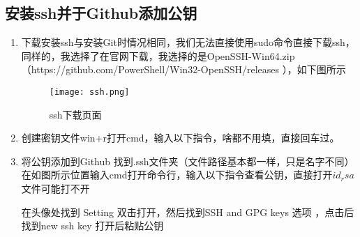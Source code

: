 \documentclass{zjureport}
\begin{document}
	\subsection{安装ssh并于Github添加公钥}
		\begin{enumerate}
			\item{下载安装ssh}与安装Git时情况相同，我们无法直接使用sudo命令直接下载ssh，同样的，我选择了在官网下载，我选择的是OpenSSH-Win64.zip（https://github.com/PowerShell/Win32-OpenSSH/releases ），如下图所示
			
			\begin{figure}[!htbp]
				\centering
				\texttt{[image: ssh.png]}
				\caption{ssh下载页面}
				\label{fig:dist}
			\end{figure}
			\item{创建密钥文件}win+r打开cmd，输入以下指令，啥都不用填，直接回车过。
			
		
			\item{将公钥添加到Github}
					找到.ssh文件夹（文件路径基本都一样，只是名字不同）
					在如图所示位置输入cmd打开命令行，输入以下指令查看公钥，直接打开$id_rsa$文件可能打不开
					
					
					
					\begin{figure}[htbp]
					\centering
				\end{figure}
					在头像处找到 Setting 双击打开，然后找到SSH and GPG keys 选项 ，点击后找到new ssh key 打开后粘贴公钥 
				\begin{figure}[htbp]
					\centering
				\end{figure}
		\end{enumerate}
	
\end{document}
